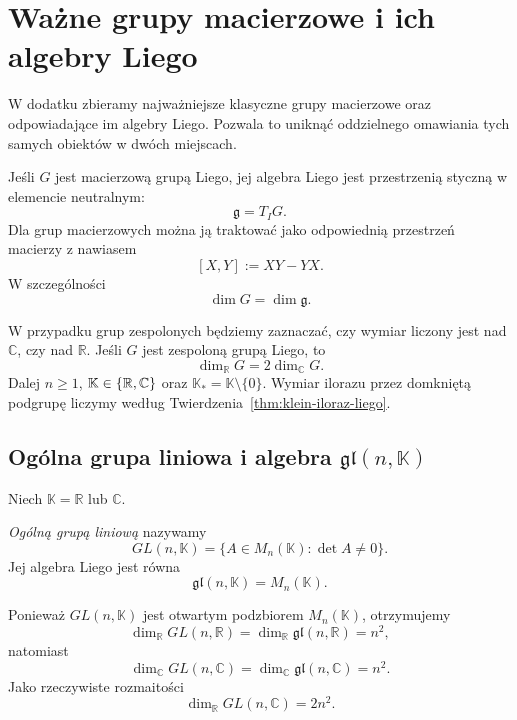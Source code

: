 \chapter{Ważne grupy macierzowe i ich algebry Liego}
\label{app:grupy-algebry-macierzowe}


W dodatku zbieramy najważniejsze klasyczne grupy macierzowe oraz
odpowiadające im algebry Liego. Pozwala to uniknąć oddzielnego
omawiania tych samych obiektów w dwóch miejscach.

Jeśli $G$ jest macierzową grupą Liego, jej algebra Liego jest
przestrzenią styczną w elemencie neutralnym:
\[
\mathfrak g=T_IG.
\]
Dla grup macierzowych można ją traktować jako odpowiednią przestrzeń
macierzy z nawiasem
\[
[X,Y]:=XY-YX.
\]
W szczególności
\[
\dim G=\dim\mathfrak g.
\]

W przypadku grup zespolonych będziemy zaznaczać, czy wymiar liczony
jest nad $\mathbb C$, czy nad $\mathbb R$. Jeśli $G$ jest zespoloną
grupą Liego, to
\[
\dim_{\mathbb R}G
=
2\dim_{\mathbb C}G.
\]
Dalej $n\geq1$, $\mathbb K\in\{\mathbb{R},\mathbb{C}\}$ oraz
$\mathbb K_*=\mathbb K\setminus\{0\}$.
Wymiar ilorazu przez domkniętą podgrupę liczymy
według Twierdzenia~\ref{thm:klein-iloraz-liego}.



\section{Ogólna grupa liniowa i algebra
\texorpdfstring{$\mathfrak{gl}(n,\mathbb K)$}{gl(n,K)}}
\label{sec:app-grupa-gl}


Niech $\mathbb K=\mathbb R$ lub $\mathbb C$.

\begin{definicja}
\emph{Ogólną grupą liniową} nazywamy
\[
GL(n,\mathbb K)
=
\{A\in M_n(\mathbb K):\det A\neq0\}.
\]
Jej algebra Liego jest równa
\[
\mathfrak{gl}(n,\mathbb K)
=
M_n(\mathbb K).
\]
\end{definicja}

Ponieważ $GL(n,\mathbb K)$ jest otwartym podzbiorem
$M_n(\mathbb K)$, otrzymujemy
\[
\dim_{\mathbb R}GL(n,\mathbb R)
=
\dim_{\mathbb R}\mathfrak{gl}(n,\mathbb R)
=
n^2,
\]
natomiast
\[
\dim_{\mathbb C}GL(n,\mathbb C)
=
\dim_{\mathbb C}\mathfrak{gl}(n,\mathbb C)
=
n^2.
\]
Jako rzeczywiste rozmaitości
\[
\dim_{\mathbb R}GL(n,\mathbb C)=2n^2.
\]



